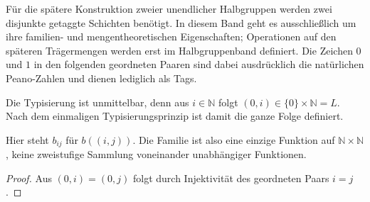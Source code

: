 \documentclass[main.tex]{subfiles}
\begin{document}
Für die spätere Konstruktion zweier unendlicher Halbgruppen werden zwei
disjunkte getaggte Schichten benötigt. In diesem Band geht es ausschließlich
um ihre familien- und mengentheoretischen Eigenschaften; Operationen auf den
späteren Trägermengen werden erst im Halbgruppenband definiert.
Die Zeichen \(0\) und \(1\) in den folgenden geordneten Paaren sind dabei
ausdrücklich die natürlichen Peano-Zahlen und dienen lediglich als Tags.




Die Typisierung ist unmittelbar, denn aus \(i\in\mathbb N\) folgt
\((0,i)\in\{0\}\times\mathbb N=L\). Nach dem einmaligen
Typisierungsprinzip ist damit die ganze Folge definiert.


Hier steht \(b_{ij}\) für \(b((i,j))\). Die Familie ist also eine einzige
Funktion auf \(\mathbb N\times\mathbb N\), keine zweistufige Sammlung
voneinander unabhängiger Funktionen.

\begin{proof}
Aus \((0,i)=(0,j)\) folgt durch Injektivität des geordneten Paars
\(i=j\).
\end{proof}
\end{document}
